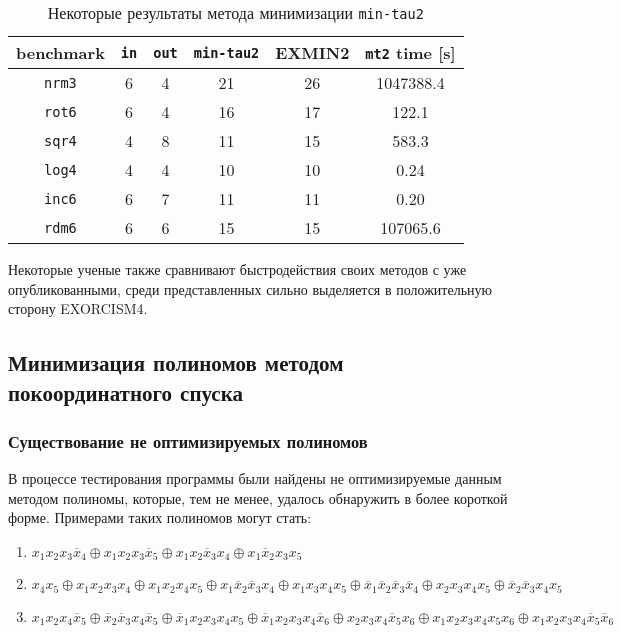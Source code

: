 \documentclass[a4paper,12pt,titlepage,finall]{article}
\begin{document}
\begin{table}[h!]
\centering
\begin{tabular}{ |c||c|c||c|c|c| }
\hline
\textbf{benchmark} & \texttt{\bf in} & \texttt{\bf out} & \texttt{min-tau2} & \textsc{EXMIN2} & \texttt{mt2} time [s] \\
\hline\hline
\texttt{nrm3} & 6 & 4 & 21 & 26 & 1047388.4 \\
\hline
\texttt{rot6} & 6 & 4 & 16 & 17 & 122.1     \\
\hline
\texttt{sqr4} & 4 & 8 & 11 & 15 & 583.3     \\
\hline\hline
\texttt{log4} & 4 & 4 & 10 & 10 & 0.24      \\
\hline
\texttt{inc6} & 6 & 7 & 11 & 11 & 0.20      \\
\hline
\texttt{rdm6} & 6 & 6 & 15 & 15 & 107065.6  \\
\hline
\end{tabular}
\caption{Некоторые результаты метода минимизации \texttt{min-tau2}}
\label{table_mintau}
\end{table}

Некоторые ученые также сравнивают быстродействия своих методов с уже опубликованными, среди представленных сильно выделяется в положительную сторону \textsc{EXORCISM4}.

\subsection{Минимизация полиномов методом покоординатного спуска}

\subsubsection{Существование не оптимизируемых полиномов}

В процессе тестирования программы были найдены не оптимизируемые данным методом полиномы, которые, тем не менее, удалось обнаружить в более короткой форме. Примерами таких полиномов могут стать:
\begin{enumerate}
    \item $ x_1 x_2 x_3 \overline x_4 \oplus x_1 x_2 x_3 \overline x_5 \oplus x_1 x_2 \overline x_3 x_4 \oplus x_1 \overline x_2 x_3 x_5 $
    \item $ x_4 x_5 \oplus x_1 x_2 x_3 x_4 \oplus x_1 x_2 x_4 x_5 \oplus x_1 \overline x_2 \overline x_3 x_4 \oplus x_1 x_3 x_4 x_5 \oplus \overline x_1 \overline x_2 \overline x_3 \overline x_4 \oplus x_2 x_3 x_4 x_5 \oplus \overline x_2 \overline x_3 x_4 x_5 $
    \item $ x_1 x_2 x_4 \overline x_5 \oplus \overline x_2 \overline x_3 x_4 \overline x_5 \oplus \overline x_1 x_2 x_3 x_4 x_5 \oplus \overline x_1 x_2 x_3 x_4 \overline x_6 \oplus x_2 x_3 x_4 \overline x_5 x_6 \oplus x_1 x_2 x_3 x_4 x_5 x_6 \oplus x_1 x_2 x_3 x_4 \overline x_5 \overline x_6 $
\end{enumerate}
\end{document}
